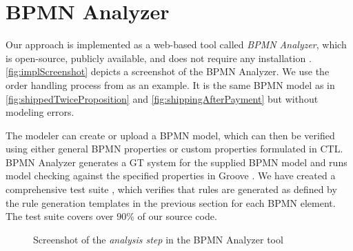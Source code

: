\documentclass{lmcs} %
\begin{document}
\section{BPMN Analyzer} \label{sec:impl}

Our approach is implemented as a web-based tool called \textit{BPMN Analyzer}, which is open-source, publicly available, and does not require any installation \cite{timkrauterLMCS2024Artifacts2023, krauterFormalizationAnalysisBPMN2023}.
\autoref{fig:implScreenshot} depicts a screenshot of the BPMN Analyzer.
We use the order handling process from \cite{ruckerPracticalProcessAutomation2021} as an example.
It is the same BPMN model as in \autoref{fig:shippedTwiceProposition} and \autoref{fig:shippingAfterPayment} but without modeling errors.

The modeler can create or upload a BPMN model, which can then be verified using either general BPMN properties or custom properties formulated in CTL.
BPMN Analyzer generates a GT system for the supplied BPMN model and runs model checking against the specified properties in Groove \cite{kastenbergModelCheckingDynamic2006}. 
We have created a comprehensive test suite \cite{timkrauterLMCS2024Artifacts2023}, which verifies that rules are generated as defined by the rule generation templates in the previous section for each BPMN element.
The test suite covers over 90\% of our source code.

\begin{figure}[ht]
    \centering
    \caption{Screenshot of the \textit{analysis step} in the BPMN Analyzer tool}
    \label{fig:implScreenshot}
\end{figure}
\end{document}
